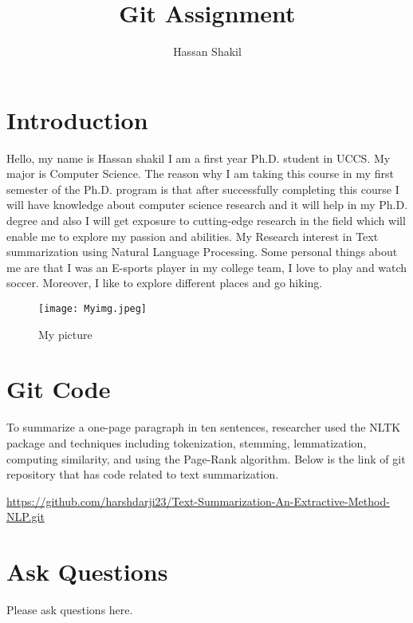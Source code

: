 




\title{Git Assignment}
\author{Hassan Shakil}

\maketitle


\section{Introduction}

Hello, my name is Hassan shakil I am a first year Ph.D. student in UCCS. My major is Computer Science. The reason why I am taking this course in my first semester of the Ph.D. program is that after successfully completing this course I will have knowledge about computer science research and it will help in my Ph.D. degree and also I will get exposure to cutting-edge research in the field which will enable me to explore my passion and abilities. My Research interest in Text summarization using Natural Language Processing. Some personal things about me are that I was an E-sports player in my college team, I love to play and watch soccer. Moreover, I like to explore different places and go hiking.

\begin{figure}[htp]
    \centering
    \texttt{[image: Myimg.jpeg]}
    \caption{My picture}
    \label{fig:Myimg}
\end{figure}

\section{Git Code}
To summarize a one-page paragraph in ten sentences, researcher used the NLTK package and techniques including tokenization, stemming, lemmatization, computing similarity, and using the Page-Rank algorithm. Below is the link of git repository that has code related to text summarization.

\url{https://github.com/harshdarji23/Text-Summarization-An-Extractive-Method-NLP.git}

\section{Ask Questions}
Please ask questions here.

